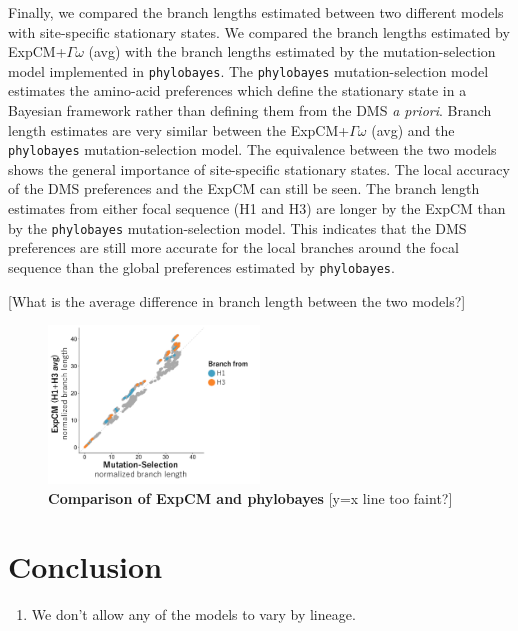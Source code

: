 \documentclass[11pt]{article}
\newcommand\skhcomment[1]{{\color{cyan}[#1]}}
\begin{document}
Finally, we compared the branch lengths estimated between two different models with site-specific stationary states. 
We compared the branch lengths estimated by ExpCM+$\Gamma\omega$ (avg) with the branch lengths estimated by the mutation-selection model implemented in \texttt{phylobayes}. 
The \texttt{phylobayes} mutation-selection model estimates the amino-acid preferences which define the stationary state in a Bayesian framework rather than defining them from the DMS \textit{a priori}. 
Branch length estimates are very similar between the ExpCM+$\Gamma\omega$ (avg) and the \texttt{phylobayes} mutation-selection model. 
The equivalence between the two models shows the general importance of site-specific stationary states. 
The local accuracy of the DMS preferences and the ExpCM can still be seen. 
The branch length estimates from either focal sequence (H1 and H3) are longer by the ExpCM than by the \texttt{phylobayes} mutation-selection model. 
This indicates that the DMS preferences are still more accurate for the local branches around the focal sequence than the global preferences estimated by \texttt{phylobayes}. 

\skhcomment{What is the average difference in branch length between the two models?}

\begin{figure}[H]
\centerline{\includegraphics[width=0.5\textwidth]{figures/phylobayes.pdf}}
\caption{\label{fig:phylobayes}
\textbf{Comparison of ExpCM and phylobayes}
\skhcomment{y=x line too faint?}
}
\end{figure}

\section*{Conclusion}

\begin{enumerate}
  \item We don't allow any of the models to vary by lineage. 
\end{enumerate}
\end{document}
